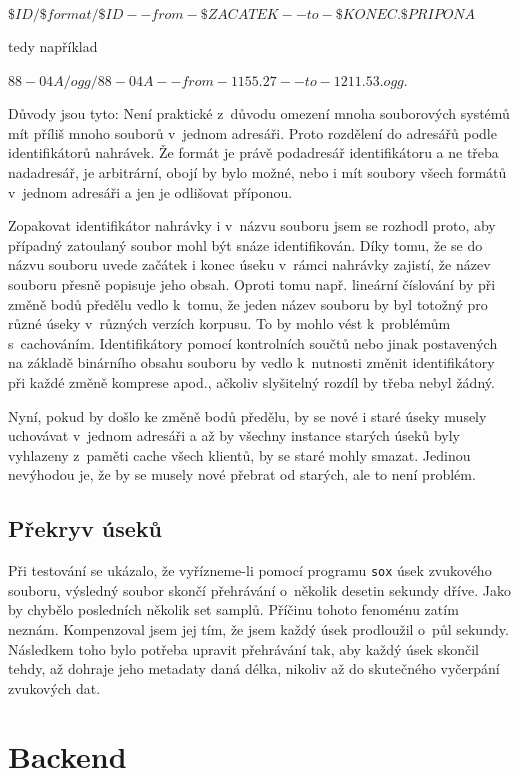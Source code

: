 $\$ID/\$format/\$ID--from-\$ZACATEK--to-\$KONEC.\$PRIPONA$

tedy například

$88-04A/ogg/88-04A--from-1155.27--to-1211.53.ogg$.

Důvody jsou tyto: Není praktické z~důvodu omezení mnoha souborových systémů mít
příliš mnoho souborů v~jednom adresáři. Proto rozdělení do adresářů podle
identifikátorů nahrávek. Že formát je právě podadresář identifikátoru a ne třeba
nadadresář, je arbitrární, obojí by bylo možné, nebo i mít soubory všech formátů
v~jednom adresáři a jen je odlišovat příponou.

Zopakovat identifikátor nahrávky i v~názvu souboru jsem se rozhodl proto, aby
případný zatoulaný soubor mohl být snáze identifikován. Díky tomu, že se do
názvu souboru uvede začátek i konec úseku v~rámci nahrávky zajistí, že název
souboru přesně popisuje jeho obsah. Oproti tomu např. lineární číslování by při
změně bodů předělu vedlo k~tomu, že jeden název souboru by byl totožný pro různé
úseky v~různých verzích korpusu. To by mohlo vést k~problémům s~cachováním.
Identifikátory pomocí kontrolních součtů nebo jinak postavených na základě
binárního obsahu souboru by vedlo k~nutnosti změnit identifikátory při každé
změně komprese apod., ačkoliv slyšitelný rozdíl by třeba nebyl žádný.

Nyní, pokud by došlo ke změně bodů předělu, by se nové i staré úseky musely
uchovávat v~jednom adresáři a až by všechny instance starých úseků byly
vyhlazeny z~paměti cache všech klientů, by se staré mohly smazat. Jedinou
nevýhodou je, že by se musely nové přebrat od starých, ale to není problém.

\subsection{Překryv úseků}

Při testování se ukázalo, že vyřízneme-li pomocí programu \texttt{sox} úsek
zvukového souboru, výsledný soubor skončí přehrávání o~několik desetin sekundy
dříve. Jako by chybělo posledních několik set samplů. Příčinu tohoto fenoménu
zatím neznám. Kompenzoval jsem jej tím, že jsem každý úsek prodloužil o~půl
sekundy. Následkem toho bylo potřeba upravit přehrávání tak, aby každý úsek
skončil tehdy, až dohraje jeho metadaty daná délka, nikoliv až do skutečného
vyčerpání zvukových dat.

\section{Backend}


